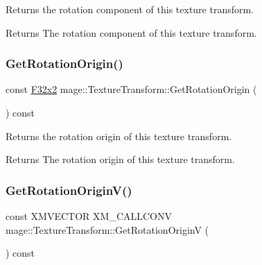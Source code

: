 Returns the rotation component of this texture transform.

\begin{DoxyReturn}{Returns}
The rotation component of this texture transform. 
\end{DoxyReturn}
\mbox{\label{classmage_1_1_texture_transform_a22ace56e39d1987fb0d46982536121fe}} 
\subsubsection{\texorpdfstring{Get\+Rotation\+Origin()}{GetRotationOrigin()}}
{\footnotesize\ttfamily const \mbox{\hyperlink{namespacemage_aee4759dedc8def6c6dec26b5c7eddf29}{F32x2}} mage\+::\+Texture\+Transform\+::\+Get\+Rotation\+Origin (\begin{DoxyParamCaption}{ }\end{DoxyParamCaption}) const\hspace{0.3cm}{\ttfamily [noexcept]}}

Returns the rotation origin of this texture transform.

\begin{DoxyReturn}{Returns}
The rotation origin of this texture transform. 
\end{DoxyReturn}
\mbox{\label{classmage_1_1_texture_transform_a62a64589318d6cdc6792f732a34468a1}} 
\subsubsection{\texorpdfstring{Get\+Rotation\+Origin\+V()}{GetRotationOriginV()}}
{\footnotesize\ttfamily const X\+M\+V\+E\+C\+T\+OR X\+M\+\_\+\+C\+A\+L\+L\+C\+O\+NV mage\+::\+Texture\+Transform\+::\+Get\+Rotation\+OriginV (\begin{DoxyParamCaption}{ }\end{DoxyParamCaption}) const\hspace{0.3cm}{\ttfamily [noexcept]}}

